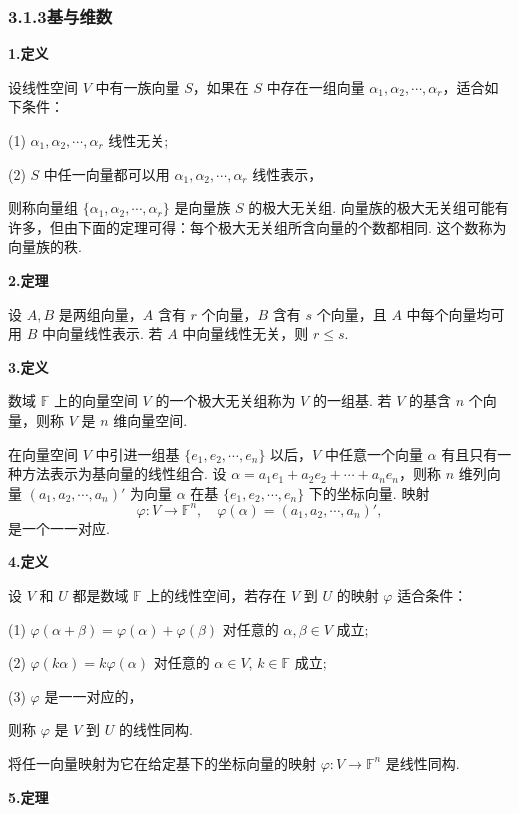 \documentclass[UTF8,12pt,a4paper,fontset=fandol]{ctexart}
\begin{document}
\subsubsection*{3.1.3\quad 基与维数}

\noindent\textbf{1.\quad 定义}

设线性空间 $V$ 中有一族向量 $S$，如果在 $S$ 中存在一组向量 $\alpha_1,\alpha_2,\cdots,\alpha_r$，适合如下条件：

(1) $\alpha_1,\alpha_2,\cdots,\alpha_r$ 线性无关;

(2) $S$ 中任一向量都可以用 $\alpha_1,\alpha_2,\cdots,\alpha_r$ 线性表示，

则称向量组 $\{\alpha_1,\alpha_2,\cdots,\alpha_r\}$ 是向量族 $S$ 的极大无关组. 向量族的极大无关组可能有许多，但由下面的定理可得：每个极大无关组所含向量的个数都相同. 这个数称为向量族的秩.

\noindent\textbf{2.\quad 定理}

设 $A,B$ 是两组向量，$A$ 含有 $r$ 个向量，$B$ 含有 $s$ 个向量，且 $A$ 中每个向量均可用 $B$ 中向量线性表示. 若 $A$ 中向量线性无关，则 $r\le s$.

\noindent\textbf{3.\quad 定义}

数域 $\mathbb{F}$ 上的向量空间 $V$ 的一个极大无关组称为 $V$ 的一组基. 若 $V$ 的基含 $n$ 个向量，则称 $V$ 是 $n$ 维向量空间.

在向量空间 $V$ 中引进一组基 $\{e_1,e_2,\cdots,e_n\}$ 以后，$V$ 中任意一个向量 $\alpha$ 有且只有一种方法表示为基向量的线性组合. 设 $\alpha=a_1e_1+a_2e_2+\cdots+a_ne_n$，则称 $n$ 维列向量 $(a_1,a_2,\cdots,a_n)'$ 为向量 $\alpha$ 在基 $\{e_1,e_2,\cdots,e_n\}$ 下的坐标向量. 映射
\[
\varphi:V\to\mathbb{F}^n,\quad \varphi(\alpha)=(a_1,a_2,\cdots,a_n)',
\]
是一个一一对应.

\noindent\textbf{4.\quad 定义}

设 $V$ 和 $U$ 都是数域 $\mathbb{F}$ 上的线性空间，若存在 $V$ 到 $U$ 的映射 $\varphi$ 适合条件：

(1) $\varphi(\alpha+\beta)=\varphi(\alpha)+\varphi(\beta)$ 对任意的 $\alpha,\beta\in V$ 成立;

(2) $\varphi(k\alpha)=k\varphi(\alpha)$ 对任意的 $\alpha\in V$, $k\in\mathbb{F}$ 成立;

(3) $\varphi$ 是一一对应的，

则称 $\varphi$ 是 $V$ 到 $U$ 的线性同构.

将任一向量映射为它在给定基下的坐标向量的映射 $\varphi:V\to\mathbb{F}^n$ 是线性同构.

\noindent\textbf{5.\quad 定理}
\end{document}

